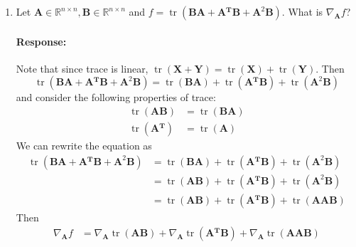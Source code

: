 \documentclass [11pt] {article}
\newcommand{\R}{\mathbb{R}}
\newcommand{\T}{\bf{T}}
\newcommand{\A}{\bf{A}}
\newcommand{\AT}{\bf{A$^{\T}$}}
\newcommand{\X}{\bf{X}}
\newcommand{\Y}{\bf{Y}}
\newcommand{\B}{\bf{B}}
\newenvironment{response}{\begin{responseframe}\vspace{-10pt}\paragraph{Response:}}{\end{responseframe}}
\DeclareMathOperator{\tr}{tr}
\renewcommand{\bf}[1]{\textbf{{#1}}}
\begin{document}
\begin{enumerate}
\begin{enumerate}[itemsep=10pt]
                \newpage
            \item Let $\A \in \R^{n \times n}, \B \in \R^{n \times n}$ and 
                $f = \tr\left( \B \A + \AT \B + \A^2 \B \right)$. What is $\nabla_{\A} f$?
                \begin{response}
                    Note that since trace is linear, $\tr(\X + \Y) = \tr(\X) + \tr(\Y)$. Then
                    \[
                        \tr \left( \B \A + \AT \B + \A^2 \B \right) = 
                        \tr \left( \B \A \right) + 
                        \tr \left( \AT \B \right) + 
                        \tr \left( \A^2 \B \right)
                    \]
                    and consider the following properties of trace:
                    \begin{align*}
                        \tr \left( \A \B \right) &= \tr \left( \B \A \right) \\
                        \tr \left( \AT \right) &= \tr \left( \A \right)
                    \end{align*}
                    We can rewrite the equation as 
                    \begin{align*}
                        \tr \left( \B \A + \AT \B + \A^2 \B \right) &= 
                        \tr \left( \B \A \right) + 
                        \tr \left( \AT \B \right) + 
                        \tr \left( \A^2 \B \right) \\
                                                                    &= 
                                                                    \tr \left( \A \B \right) + 
                                                                    \tr \left( \AT \B \right) + 
                                                                    \tr \left( \A^2 \B \right) \\
                                                                    &= 
                                                                    \tr \left( \A \B \right) + 
                                                                    \tr \left( \AT \B \right) + 
                                                                    \tr \left( \A \A \B \right)
                    \end{align*}
                    Then
                    \begin{align*}
                        \nabla_{\A} f &= 
                        \nabla_{\A} \tr \left( \A \B \right) + 
                        \nabla_{\A} \tr \left( \AT \B \right) + 
                        \nabla_{\A} \tr \left( \A \A \B \right) \\

\end{align*}
\end{response}
\end{enumerate}
\end{enumerate}
\end{document}
